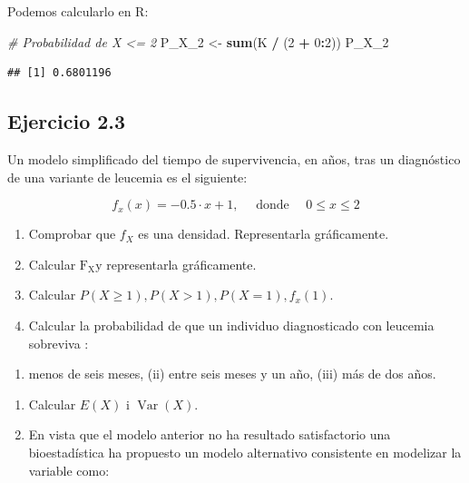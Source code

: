 \documentclass[
]{article}
\newenvironment{Shaded}{\begin{snugshade}}{\end{snugshade}}
\newcommand{\CommentTok}[1]{\textcolor[rgb]{0.56,0.35,0.01}{\textit{#1}}}
\newcommand{\DecValTok}[1]{\textcolor[rgb]{0.00,0.00,0.81}{#1}}
\newcommand{\FunctionTok}[1]{\textcolor[rgb]{0.13,0.29,0.53}{\textbf{#1}}}
\newcommand{\NormalTok}[1]{#1}
\newcommand{\OtherTok}[1]{\textcolor[rgb]{0.56,0.35,0.01}{#1}}
\newcommand{\SpecialCharTok}[1]{\textcolor[rgb]{0.81,0.36,0.00}{\textbf{#1}}}
\providecommand{\tightlist}{%
  \setlength{\itemsep}{0pt}\setlength{\parskip}{0pt}}
\begin{document}
Podemos calcularlo en R:

\begin{Shaded}
\begin{Highlighting}[]
\CommentTok{\# Probabilidad de X \textless{}= 2}
\NormalTok{P\_X\_2 }\OtherTok{\textless{}{-}} \FunctionTok{sum}\NormalTok{(K }\SpecialCharTok{/}\NormalTok{ (}\DecValTok{2} \SpecialCharTok{+} \DecValTok{0}\SpecialCharTok{:}\DecValTok{2}\NormalTok{))}
\NormalTok{P\_X\_2}
\end{Highlighting}
\end{Shaded}

\begin{verbatim}
## [1] 0.6801196
\end{verbatim}

\subsection{Ejercicio 2.3}\label{ejercicio-2.3}

Un modelo simplificado del tiempo de supervivencia, en años, tras un diagnóstico de una variante de leucemia es el siguiente:

\[
f_{x}(x)=-0.5 \cdot x+1, \quad \text { donde } \quad 0 \leq x \leq 2
\]

\begin{enumerate}
\def\labelenumi{\alph{enumi})}
\tightlist
\item
  Comprobar que \(f_{X}\) es una densidad. Representarla gráficamente.
\item
  Calcular \(\mathrm{F}_{\mathrm{X}} \mathrm{y}\) representarla gráficamente.
\item
  Calcular \(P(X \geq 1), P(X>1), P(X=1), f_{x}(1)\).
\item
  Calcular la probabilidad de que un individuo diagnosticado con leucemia sobreviva :
\end{enumerate}

\begin{enumerate}
\def\labelenumi{(\roman{enumi})}
\tightlist
\item
  menos de seis meses, (ii) entre seis meses y un año, (iii) más de dos años.
\end{enumerate}

\begin{enumerate}
\def\labelenumi{\alph{enumi})}
\setcounter{enumi}{4}
\tightlist
\item
  Calcular \(E(X)\) i \(\operatorname{Var}(X)\).
\item
  En vista que el modelo anterior no ha resultado satisfactorio una bioestadística ha propuesto un modelo alternativo consistente en modelizar la variable como:
\end{enumerate}
\end{document}
